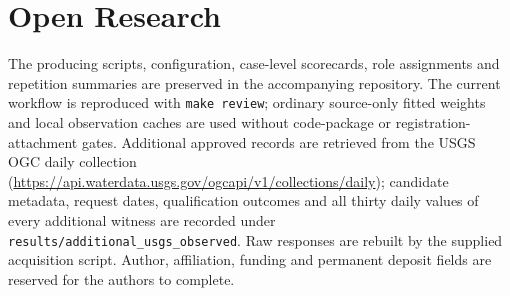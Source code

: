 \documentclass[draft,linenumbers]{agujournal2025}
\begin{document}
\section*{Open Research}
The producing scripts, configuration, case-level scorecards, role assignments and repetition summaries are preserved in the accompanying repository. The current workflow is reproduced with \texttt{make review}; ordinary source-only fitted weights and local observation caches are used without code-package or registration-attachment gates. Additional approved records are retrieved from the USGS OGC daily collection (\url{https://api.waterdata.usgs.gov/ogcapi/v1/collections/daily}); candidate metadata, request dates, qualification outcomes and all thirty daily values of every additional witness are recorded under \texttt{results/additional\_usgs\_observed}. Raw responses are rebuilt by the supplied acquisition script. Author, affiliation, funding and permanent deposit fields are reserved for the authors to complete.





\end{document}
